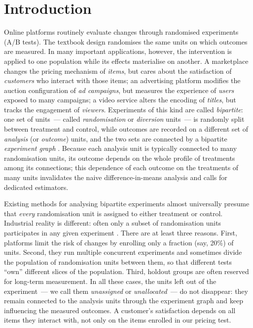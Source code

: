 \documentclass[sigconf,nonacm]{acmart}
\begin{document}

\maketitle

\section{Introduction}\label{sec:introduction}

Online platforms routinely evaluate changes through randomised experiments (A/B tests). The textbook design randomises the same units on which outcomes are measured. In many important applications, however, the intervention is applied to one population while its effects materialise on another. A marketplace changes the pricing mechanism of \emph{items}, but cares about the satisfaction of \emph{customers} who interact with those items; an advertising platform modifies the auction configuration of \emph{ad campaigns}, but measures the experience of \emph{users} exposed to many campaigns; a video service alters the encoding of \emph{titles}, but tracks the engagement of \emph{viewers}. Experiments of this kind are called \emph{bipartite}: one set of units~--- called \emph{randomisation} or \emph{diversion} units~--- is randomly split between treatment and control, while outcomes are recorded on a different set of \emph{analysis} (or \emph{outcome}) units, and the two sets are connected by a bipartite \emph{experiment graph} \cite{zigler2021bipartite,harshaw2023erl,doudchenko2020causal}. Because each analysis unit is typically connected to many randomisation units, its outcome depends on the whole profile of treatments among its connections; this dependence of each outcome on the treatments of many units invalidates the naive difference-in-means analysis and calls for dedicated estimators.

Existing methods for analysing bipartite experiments almost universally presume that \emph{every} randomisation unit is assigned to either treatment or control. Industrial reality is different: often only a subset of randomisation units participates in any given experiment \cite{kohavi2020trustworthy,tang2010overlapping}. There are at least three reasons. First, platforms limit the risk of changes by enrolling only a fraction (say, 20\%) of units. Second, they run multiple concurrent experiments and sometimes divide the population of randomisation units between them, so that different tests ``own'' different slices of the population. Third, holdout groups are often reserved for long-term measurement. In all these cases, the units left out of the experiment~--- we call them \emph{unassigned} or \emph{unallocated}~--- do not disappear: they remain connected to the analysis units through the experiment graph and keep influencing the measured outcomes. A customer's satisfaction depends on all items they interact with, not only on the items enrolled in our pricing test.
\end{document}
